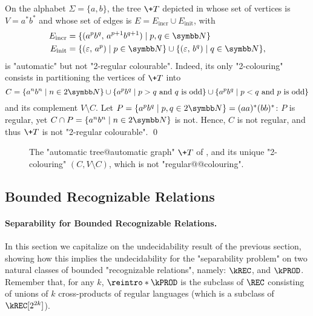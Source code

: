 \begin{example}
    \AP\label{ex:tree-not-2-reg-colourable}
    On the alphabet $\Sigma = \{a,b\}$, the tree $\+T$ depicted in  whose set of vertices is $V = a^*b^*$ and whose set 
    of edges is $E = E_{\mathrm{incr}} \cup E_{\mathrm{init}}$, with 
    \begin{align*}
        E_{\mathrm{incr}} & = \{(a^pb^q,\, a^{p+1}b^{q+1}) \mid p,q \in \N\} \\
        E_{\mathrm{init}} & = \{(\varepsilon,\, a^p) \mid p \in \N\} \cup \{(\varepsilon,\, b^q) \mid q \in \N\}, 
    \end{align*}    
    is "automatic" but not "2-regular colourable". 
    Indeed, its only "2-colouring"
    consists in partitioning the vertices of $\+T$ into
    \[
        C = \{a^n b^n \mid n \in 2\N\}
            \cup \{a^p b^q \mid p > q \text{ and $q$ is odd}\}
            \cup \{a^p b^q \mid p < q \text{ and $p$ is odd}\}
    \]
    and its complement $V \setminus C$.
    Let $P = \{a^p b^q \mid p, q \in 2\N\} = (aa)^*(bb)^*$:
    $P$ is regular, yet $C \cap P = \{a^n b^n \mid n \in 2\N\}$ is not.
    Hence, $C$ is not regular, and thus $\+T$ is not "2-regular colourable".
    \qed 
\end{example}

\begin{figure}[htb]
    \centering
	\begin{tikzpicture}
		
	\end{tikzpicture}
    \caption{
        \label{fig:tree-not-2reg-colour}
        The "automatic tree@automatic graph" $\+T$ of ,
        and its unique "2-colouring" $(C, V\setminus C)$, which is not "regular@@colouring".
    }
\end{figure}


\subsection{Bounded Recognizable Relations}

\paragraph*{Separability for Bounded Recognizable Relations.}
In this section we capitalize on the undecidability result of the previous section, showing how this implies the undecidability for the "separability problem" on two natural classes of bounded "recognizable relations", namely: $\kREC$, and $\kPROD$.
Remember that, for any $k$, $\reintro*\kPROD$ is the subclass of $\REC$ consisting of unions of $k$ cross-products of regular languages (which is a subclass of $\kREC[2^{2k}]$).

